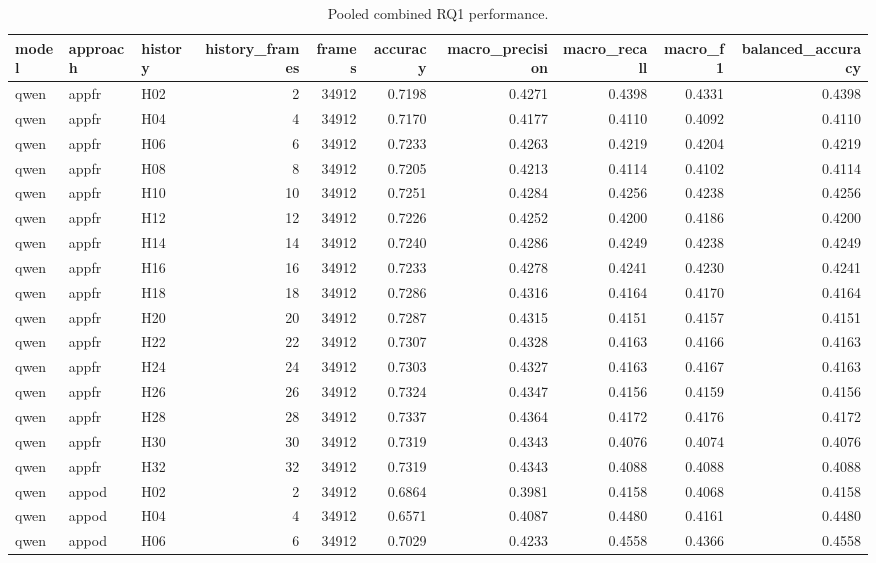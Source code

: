 \begin{table}[tbp]
\caption{Pooled combined RQ1 performance.}
\label{tab:rq1_descriptive_pooled}
\begin{tabular}{lllrrrrrrr}
\toprule
model & approach & history & history\_frames & frames & accuracy & macro\_precision & macro\_recall & macro\_f1 & balanced\_accuracy \\
\midrule
qwen & appfr & H02 & 2 & 34912 & 0.7198 & 0.4271 & 0.4398 & 0.4331 & 0.4398 \\
qwen & appfr & H04 & 4 & 34912 & 0.7170 & 0.4177 & 0.4110 & 0.4092 & 0.4110 \\
qwen & appfr & H06 & 6 & 34912 & 0.7233 & 0.4263 & 0.4219 & 0.4204 & 0.4219 \\
qwen & appfr & H08 & 8 & 34912 & 0.7205 & 0.4213 & 0.4114 & 0.4102 & 0.4114 \\
qwen & appfr & H10 & 10 & 34912 & 0.7251 & 0.4284 & 0.4256 & 0.4238 & 0.4256 \\
qwen & appfr & H12 & 12 & 34912 & 0.7226 & 0.4252 & 0.4200 & 0.4186 & 0.4200 \\
qwen & appfr & H14 & 14 & 34912 & 0.7240 & 0.4286 & 0.4249 & 0.4238 & 0.4249 \\
qwen & appfr & H16 & 16 & 34912 & 0.7233 & 0.4278 & 0.4241 & 0.4230 & 0.4241 \\
qwen & appfr & H18 & 18 & 34912 & 0.7286 & 0.4316 & 0.4164 & 0.4170 & 0.4164 \\
qwen & appfr & H20 & 20 & 34912 & 0.7287 & 0.4315 & 0.4151 & 0.4157 & 0.4151 \\
qwen & appfr & H22 & 22 & 34912 & 0.7307 & 0.4328 & 0.4163 & 0.4166 & 0.4163 \\
qwen & appfr & H24 & 24 & 34912 & 0.7303 & 0.4327 & 0.4163 & 0.4167 & 0.4163 \\
qwen & appfr & H26 & 26 & 34912 & 0.7324 & 0.4347 & 0.4156 & 0.4159 & 0.4156 \\
qwen & appfr & H28 & 28 & 34912 & 0.7337 & 0.4364 & 0.4172 & 0.4176 & 0.4172 \\
qwen & appfr & H30 & 30 & 34912 & 0.7319 & 0.4343 & 0.4076 & 0.4074 & 0.4076 \\
qwen & appfr & H32 & 32 & 34912 & 0.7319 & 0.4343 & 0.4088 & 0.4088 & 0.4088 \\
qwen & appod & H02 & 2 & 34912 & 0.6864 & 0.3981 & 0.4158 & 0.4068 & 0.4158 \\
qwen & appod & H04 & 4 & 34912 & 0.6571 & 0.4087 & 0.4480 & 0.4161 & 0.4480 \\
qwen & appod & H06 & 6 & 34912 & 0.7029 & 0.4233 & 0.4558 & 0.4366 & 0.4558 \\

\end{tabular}
\end{table}
